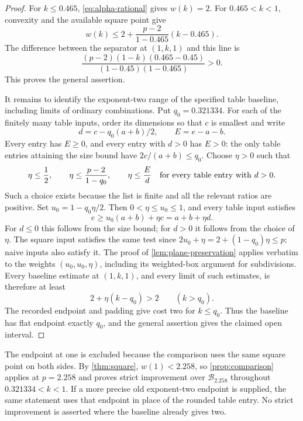 \documentclass[11pt]{article}
\numberwithin{equation}{section}
\theoremstyle{definition}
\theoremstyle{remark}
\begin{document}
\begin{proof}
For \(k\le0.465\), \eqref{eq:alpha-rational} gives \(w(k)=2\).
For \(0.465<k<1\), convexity and the available square point give
\[
 w(k)\le 2+\frac{p-2}{1-0.465}(k-0.465).
\]
The difference between the separator at \((1,k,1)\) and this line is
\begin{equation}\label{eq:positive-gap}
 \frac{(p-2)(1-k)(0.465-0.45)}
 {(1-0.45)(1-0.465)}>0.
\end{equation}
This proves the general assertion.

It remains to identify the exponent-two range of the specified table
baseline, including limits of ordinary combinations.
Put \(q_0=0.321334\).
For each of the finitely many table inputs, order its dimensions so
that \(c\) is smallest and write
\[
 d=c-q_0(a+b)/2,\qquad E=e-a-b.
\]
Every entry has \(E\ge0\), and every entry with \(d>0\) has
\(E>0\): the only table entries attaining the size bound have
\(2c/(a+b)\le q_0\).
Choose \(\eta>0\) such that
\[
 \eta\le\frac12,\qquad
 \eta\le\frac{p-2}{1-q_0},\qquad
 \eta\le\frac{E}{d}\quad\hbox{for every table entry with }d>0.
\]
Such a choice exists because the list is finite and all the relevant
ratios are positive.
Set \(u_0=1-q_0\eta/2\).
Then \(0<\eta\le u_0\le1\), and every table input satisfies
\[
 e\ge u_0(a+b)+\eta c=a+b+\eta d.
\]
For \(d\le0\) this follows from the size bound; for \(d>0\) it
follows from the choice of \(\eta\).
The square input satisfies the same test since
\(2u_0+\eta=2+(1-q_0)\eta\le p\); naive inputs also satisfy it.
The proof of \cref{lem:plane-preservation} applies verbatim to the
weights \((u_0,u_0,\eta)\), including its weighted-box argument for
subdivisions.
Every baseline estimate at \((1,k,1)\), and every limit of such
estimates, is therefore at least
\[
 2+\eta(k-q_0)>2\qquad(k>q_0).
\]
The recorded endpoint and padding give cost two for \(k\le q_0\).
Thus the baseline has flat endpoint exactly \(q_0\), and the general
assertion gives the claimed open interval.
\end{proof}

The endpoint at one is excluded because the comparison uses the same
square point on both sides.
By \cref{thm:square}, \(w(1)<2.258\), so
\cref{prop:comparison} applies at \(p=2.258\) and proves strict
improvement over \(\mathcal B_{2.258}\) throughout
\(0.321334<k<1\).
If a more precise old exponent-two endpoint is supplied, the same
statement uses that endpoint in place of the rounded table entry.
No strict improvement is asserted where the baseline already gives two.
\end{document}
